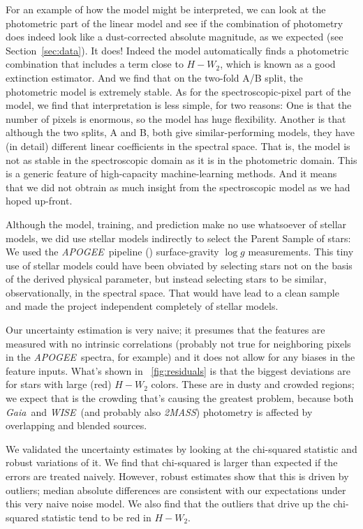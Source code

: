 \documentclass[modern]{aastex62}
\newcommand{\sectionname}{Section}
\newcommand{\acronym}[1]{{\small{#1}}}
\newcommand{\project}[1]{\textsl{#1}}
\newcommand{\apogee}{\project{\acronym{APOGEE}}}
\newcommand{\gaia}{\project{Gaia}}
\newcommand{\wise}{\project{\acronym{WISE}}}
\newcommand{\zmass}{\project{\acronym{2MASS}}}
\newcommand{\logg}{\log g}
\begin{document}
For an example of how the model might be interpreted, we can look at
the photometric part of the linear model and see if the combination of
photometry does indeed look like a dust-corrected absolute magnitude,
as we expected (see \sectionname~\ref{sec:data}).
It does! Indeed the model automatically finds a photometric
combination that includes a term close to $H-W_2$, which is known as a
good extinction estimator.
And we find that on the two-fold A/B split, the photometric model is extremely stable.
As for the spectroscopic-pixel part of the model, we find that interpretation is
less simple, for two reasons:
One is that the number of pixels is enormous, so the model has huge flexibility.
Another is that although the two splits, A and B, both give similar-performing
models, they have (in detail) different linear coefficients in the spectral space.
That is, the model is not as stable in the spectroscopic domain as it is in the
photometric domain.
This is a generic feature of high-capacity machine-learning methods.
And it means that we did not obtrain as much insight from the spectroscopic model
as we had hoped up-front.

Although the model, training, and prediction make no use whatsoever of stellar
models, we did use stellar models indirectly to select the Parent Sample of stars:
We used the \apogee\ pipeline (\citealt{aspcap}) surface-gravity $\logg$ measurements.
This tiny use of stellar models could have been obviated by selecting stars not
on the basis of the derived physical parameter, but instead selecting stars to
be similar, observationally, in the spectral space.
That would have lead to a clean sample and made the project independent completely
of stellar models.

Our uncertainty estimation is very naive; it presumes that the features are measured
with no intrinsic correlations (probably not true for neighboring pixels in the \apogee\ spectra,
for example) and it does not allow for any biases in the feature inputs.
What's shown in \figurename~\ref{fig:residuals} is that the biggest deviations are for
stars with large (red) $H-W_2$ colors.
These are in dusty and crowded regions; we expect that is the crowding that's causing the
greatest problem, because both \gaia\ and \wise\ (and probably also \zmass) photometry is
affected by overlapping and blended sources.

We validated the uncertainty estimates by looking at the chi-squared statistic and robust
variations of it.
We find that chi-squared is larger than expected if the errors are treated naively.
However, robust estimates show that this is driven by outliers;
median absolute differences are consistent with our expectations under this very naive noise model.
We also find that the outliers that drive up the chi-squared statistic tend to be red
in $H-W_2$.
\end{document}
